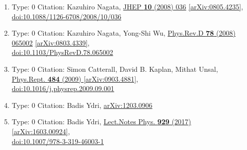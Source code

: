 \documentclass[a4paper,10pt]{article}
\begin{document}
\begin{enumerate}
\begin{enumerate}
  \item Type: 0 Citation: Kazuhiro Nagata, \href{https://www.doi.org/10.1088/1126-6708/2008/10/036}{JHEP {\bf 10} (2008) 036}  \href{https://arxiv.org/abs/0805.4235}{[arXiv:0805.4235]},\\\href{https://www.doi.org/10.1088/1126-6708/2008/10/036}{doi:10.1088/1126-6708/2008/10/036}
  \item Type: 0 Citation: Kazuhiro Nagata, Yong-Shi Wu, \href{https://www.doi.org/10.1103/PhysRevD.78.065002}{Phys.Rev.D {\bf 78} (2008) 065002}  \href{https://arxiv.org/abs/0803.4339}{[arXiv:0803.4339]},\\\href{https://www.doi.org/10.1103/PhysRevD.78.065002}{doi:10.1103/PhysRevD.78.065002}
  \item Type: 0 Citation: Simon Catterall, David B. Kaplan, Mithat Unsal, \href{https://www.doi.org/10.1016/j.physrep.2009.09.001}{Phys.Rept. {\bf 484} (2009) }  \href{https://arxiv.org/abs/0903.4881}{[arXiv:0903.4881]},\\\href{https://www.doi.org/10.1016/j.physrep.2009.09.001}{doi:10.1016/j.physrep.2009.09.001}
  \item Type: 0 Citation: Badis Ydri, \href{https://arxiv.org/abs/1203.0906}{arXiv:1203.0906}
  \item Type: 0 Citation: Badis Ydri, \href{https://www.doi.org/10.1007/978-3-319-46003-1}{Lect.Notes Phys. {\bf 929} (2017) }  \href{https://arxiv.org/abs/1603.00924}{[arXiv:1603.00924]},\\\href{https://www.doi.org/10.1007/978-3-319-46003-1}{doi:10.1007/978-3-319-46003-1}
\end{enumerate}

\end{enumerate}
\end{document}
